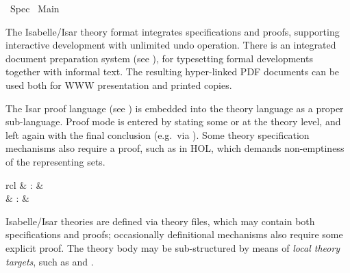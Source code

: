 %
\begin{isabellebody}%
\def\isabellecontext{Spec}%
%
\isadelimtheory
%
\endisadelimtheory
%
\isatagtheory
{}\isamarkupfalse%
\ Spec\isanewline
{}\ Main\isanewline
{}%
\endisatagtheory
{\isafoldtheory}%
%
\isadelimtheory
%
\endisadelimtheory
%
\isamarkuptrue%
%
\begin{isamarkuptext}%
The Isabelle/Isar theory format integrates specifications and
  proofs, supporting interactive development with unlimited undo
  operation.  There is an integrated document preparation system (see
  ), for typesetting formal developments
  together with informal text.  The resulting hyper-linked PDF
  documents can be used both for WWW presentation and printed copies.

  The Isar proof language (see ) is embedded into the
  theory language as a proper sub-language.  Proof mode is entered by
  stating some \hyperlink{command.theorem}{\mbox{}} or \hyperlink{command.lemma}{\mbox{}} at the theory
  level, and left again with the final conclusion (e.g.\ via \hyperlink{command.qed}{\mbox{}}).  Some theory specification mechanisms also require a proof,
  such as \hyperlink{command.typedef}{\mbox{}} in HOL, which demands non-emptiness of
  the representing sets.%
\end{isamarkuptext}%
\isamarkuptrue%
%
\isamarkuptrue%
%
\begin{isamarkuptext}%
\begin{matharray}{rcl}
    \hypertarget{command.theory}{\hyperlink{command.theory}{\mbox{}}} & : &  \\
    \hypertarget{command.global.end}{\hyperlink{command.global.end}{\mbox{}}} & : &  \\
  \end{matharray}

  Isabelle/Isar theories are defined via theory files, which may
  contain both specifications and proofs; occasionally definitional
  mechanisms also require some explicit proof.  The theory body may be
  sub-structured by means of \emph{local theory targets}, such as
  \hyperlink{command.locale}{\mbox{}} and \hyperlink{command.class}{\mbox{}}.


\end{isamarkuptext}
\end{isabellebody}
